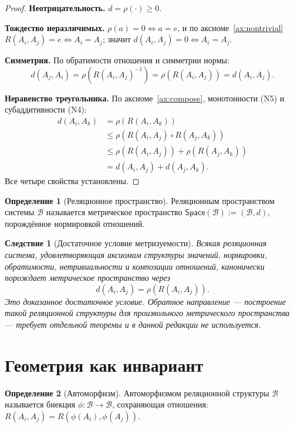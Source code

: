 \documentclass[12pt,a4paper,oneside]{book}
\theoremstyle{definition}
\newtheorem{definition}{Определение}[chapter]
\theoremstyle{plain}
\newtheorem{corollary}{Следствие}[chapter]
\theoremstyle{remark}
\newcommand{\SubParts}{\mathcal B}
\newcommand{\Rel}{R}
\newcommand{\comp}{\circ}
\newcommand{\norm}{\rho}
\newcommand{\ide}{e}
\newcommand{\Space}{\mathsf{Space}}
\begin{document}
\begin{proof}
\textbf{Неотрицательность.} $d=\norm(\cdot)\ge0$.

\textbf{Тождество неразличимых.} $\norm(a)=0\iff a=\ide$, и по
аксиоме~\ref{ax:nontrivial} $\Rel(A_i,A_j)=\ide\iff A_i=A_j$; значит $d(A_i,A_j)=0\iff
A_i=A_j$.

\textbf{Симметрия.} По обратимости отношения и симметрии нормы:
\[
d(A_j,A_i)=\norm(\Rel(A_i,A_j)^{-1})=\norm(\Rel(A_i,A_j))=d(A_i,A_j).
\]

\textbf{Неравенство треугольника.} По
аксиоме~\ref{ax:compose}, монотонности (N5) и субаддитивности (N4):
\begin{align*}
d(A_i,A_k)
&=\norm(\Rel(A_i,A_k))\\
&\le\norm(\Rel(A_i,A_j)\comp\Rel(A_j,A_k))\\
&\le\norm(\Rel(A_i,A_j))+\norm(\Rel(A_j,A_k))\\
&=d(A_i,A_j)+d(A_j,A_k).
\end{align*}
Все четыре свойства установлены.
\end{proof}

\begin{definition}[Реляционное пространство]
Реляционным пространством системы $\SubParts$ называется метрическое пространство
$\Space(\SubParts):=(\SubParts,d)$, порождённое нормировкой отношений.
\end{definition}

\begin{corollary}[Достаточное условие метризуемости]
Всякая реляционная система, удовлетворяющая аксиомам структуры значений,
нормировки, обратимости, нетривиальности и композиции отношений, канонически
порождает метрическое пространство через
\[
d(A_i,A_j)=\norm(\Rel(A_i,A_j)).
\]
Это доказанное достаточное условие. Обратное направление --- построение такой
реляционной структуры для произвольного метрического пространства --- требует
отдельной теоремы и в данной редакции не используется.
\end{corollary}

\section{Геометрия как инвариант}

\begin{definition}[Автоморфизм]
Автоморфизмом реляционной структуры $\SubParts$ называется биекция
$\phi:\SubParts\to\SubParts$, сохраняющая отношения:
$\Rel(A_i,A_j)=\Rel(\phi(A_i),\phi(A_j))$.
\end{definition}
\end{document}
